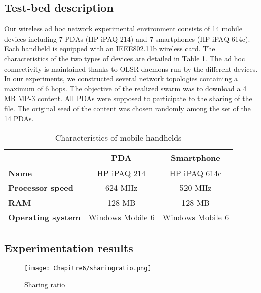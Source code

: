 \subsection{Test-bed description}
Our wireless ad hoc network experimental environment consists of 14 mobile devices including 7 PDAs (HP iPAQ 214) and 7 smartphones (HP iPAQ 614c). Each handheld is equipped with an IEEE802.11b wireless card. The characteristics of the two types of devices are detailed in Table \ref{tabcarac}. The ad hoc connectivity is maintained thanks to OLSR daemons run by the different devices. In our experiments, we constructed several network topologies containing a maximum of 6 hops. The objective of the realized swarm was to download a 4 MB MP-3 content. All PDAs were supposed to participate to the sharing of the file. The original seed of the content was chosen randomly among the set of the 14 PDAs.
\begin{table}[h!]
\center
\label{tabcarac}
\caption{Characteristics of mobile handhelds}
\begin{tabular}{|l|c|c|}
  \hline
   & \textbf{PDA} & \textbf{Smartphone} \\
  \hline
  \textbf{Name} & HP iPAQ 214 & HP iPAQ 614c\\
\hline
  \textbf{Processor speed} & 624 MHz & 520 MHz \\
  \hline
\textbf{RAM} & 128 MB & 128 MB \\
  \hline
\textbf{Operating system} & Windows Mobile 6 & Windows Mobile 6 \\
  \hline
\end{tabular}
\end{table}

\subsection{Experimentation results}
\begin{figure}[!htbp]
  \begin{center}
    \texttt{[image: Chapitre6/sharingratio.png]}
  \end{center}
  \caption{Sharing ratio}
  \label{figsharing}
\end{figure}


